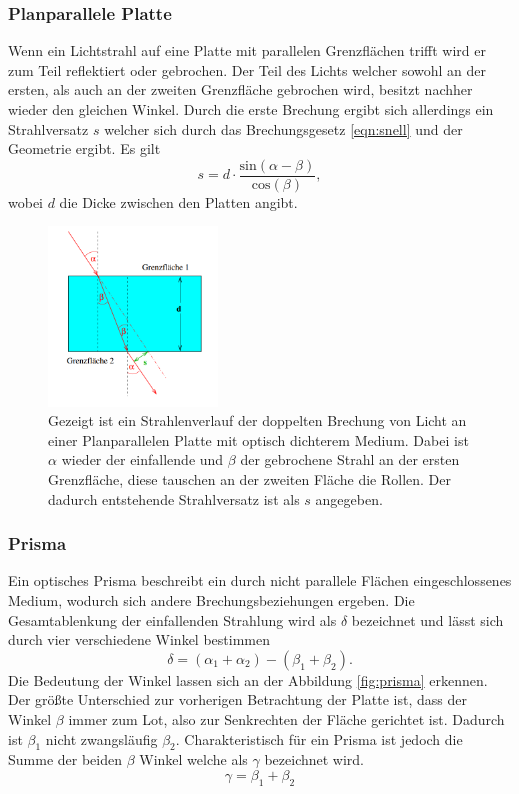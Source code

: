 \subsubsection{Planparallele Platte}
Wenn ein Lichtstrahl auf eine Platte mit parallelen Grenzflächen trifft wird er zum Teil reflektiert oder gebrochen. Der Teil des Lichts welcher sowohl an der ersten, als auch an der zweiten Grenzfläche gebrochen wird, besitzt
nachher wieder den gleichen Winkel. Durch die erste Brechung ergibt sich allerdings ein Strahlversatz $s$ welcher sich durch das Brechungsgesetz \eqref{eqn:snell} und der Geometrie ergibt. Es gilt \cite{skript}
\begin{equation}
    \label{eqn:versatz}
s = d \cdot \frac{\text{sin}(\alpha - \beta)}{\text{cos}(\beta)},
\end{equation}
wobei $d$ die Dicke zwischen den Platten angibt.
\begin{figure}
    \centering
    \includegraphics[width=0.4\textwidth]{bilder/4.png}
    \caption{Gezeigt ist ein Strahlenverlauf der doppelten Brechung von Licht an einer Planparallelen Platte mit optisch dichterem Medium. Dabei ist $\alpha$ wieder der einfallende und $\beta$ der gebrochene Strahl an der ersten Grenzfläche, diese tauschen an der zweiten Fläche die Rollen. Der dadurch entstehende 
    Strahlversatz ist als $s$ angegeben. \cite{skript}}
    \label{fig:planparallel}
\end{figure}
\subsubsection{Prisma}
Ein optisches Prisma beschreibt ein durch nicht parallele Flächen eingeschlossenes Medium, wodurch sich andere Brechungsbeziehungen ergeben. Die Gesamtablenkung der einfallenden Strahlung wird als $\delta$ bezeichnet und 
lässt sich durch vier verschiedene Winkel bestimmen \cite{skript}
\begin{equation}
    \label{eqn:deltaw}
\delta = (\alpha_1 + \alpha_2) - (\beta_1 + \beta_2).
\end{equation}
Die Bedeutung der Winkel lassen sich an der Abbildung \ref{fig:prisma} erkennen. Der größte Unterschied zur vorherigen Betrachtung der Platte ist, dass der Winkel $\beta$ immer zum Lot, also zur Senkrechten der Fläche gerichtet ist. Dadurch ist $\beta_1$ nicht zwangsläufig $\beta_2$.
Charakteristisch für ein Prisma ist jedoch die Summe der beiden $\beta$ Winkel welche als $\gamma$ bezeichnet wird.
\begin{equation*}
\gamma = \beta_1 + \beta_2
\end{equation*}

